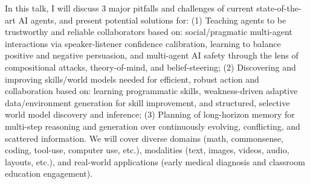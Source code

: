 In this talk, I will discuss 3 major pitfalls and challenges of current state-of-the-art AI agents, and present potential solutions for: (1) Teaching agents to be trustworthy and reliable collaborators based on: social/pragmatic multi-agent interactions via speaker-listener confidence calibration, learning to balance positive and negative persuasion, and multi-agent AI safety through the lens of compositional attacks, theory-of-mind, and belief-steering; (2) Discovering and improving skills/world models needed for efficient, robust action and collaboration based on: learning programmatic skills, weakness-driven adaptive data/environment generation for skill improvement, and structured, selective world model discovery and inference; (3) Planning of long-horizon memory for multi-step reasoning and generation over continuously evolving, conflicting, and scattered information. We will cover diverse domains (math, commonsense, coding, tool-use, computer use, etc.), modalities (text, images, videos, audio, layouts, etc.), and real-world applications (early medical diagnosis and classroom education engagement).